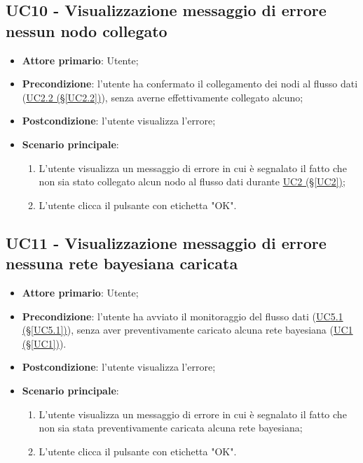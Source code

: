 \pagebreak

\subsection{UC10 - Visualizzazione messaggio di errore nessun nodo collegato}\label{UC10}
\begin{itemize}
\item \textbf{Attore primario}: Utente;
\item \textbf{Precondizione}: l'utente ha confermato il collegamento dei nodi al flusso dati (\hyperref[UC2.2]{UC2.2 (§\ref*{UC2.2})}), senza averne effettivamente collegato alcuno;
\item \textbf{Postcondizione}: l'utente visualizza l'errore;
\item \textbf{Scenario principale}: 
	\begin{enumerate}
	\item L'utente visualizza un messaggio di errore in cui è segnalato il fatto che non sia stato collegato alcun 				nodo al flusso dati durante \hyperref[UC2]{UC2 (§\ref*{UC2})};
	\item L'utente clicca il pulsante con etichetta "OK".
	\end{enumerate}
\end{itemize}

\pagebreak

\subsection{UC11 - Visualizzazione messaggio di errore nessuna rete bayesiana caricata}\label{UC11}
\begin{itemize}
\item \textbf{Attore primario}: Utente;
\item \textbf{Precondizione}: l'utente ha avviato il monitoraggio del flusso dati (\hyperref[UC5.1]{UC5.1 (§\ref*{UC5.1})}), senza aver preventivamente caricato alcuna rete bayesiana (\hyperref[UC1]{UC1 (§\ref*{UC1})}).
\item \textbf{Postcondizione}: l'utente visualizza l'errore;
\item \textbf{Scenario principale}: 
	\begin{enumerate}
	\item L'utente visualizza un messaggio di errore in cui è segnalato il fatto che non sia stata preventivamente 				caricata alcuna rete bayesiana;
	\item L'utente clicca il pulsante con etichetta "OK".
	\end{enumerate}
\end{itemize}


